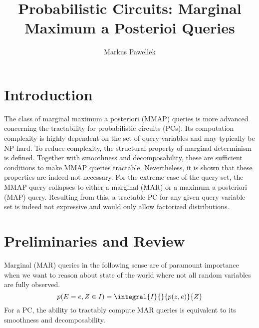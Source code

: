 \documentclass[9pt,fleqn,twoside,twocolumn]{stdglobal}
\title{%
  Probabilistic Circuits: Marginal Maximum a Posterioi Queries
}
\author{Markus Pawellek}
\begin{document}
\thispagestyle{sectionstyle}



\section{Introduction}
  The class of marginal maximum a posteriori (MMAP) queries is more advanced concerning the tractability for probabilistic circuits (PCs).
  Its computation complexity is highly dependent on the set of query variables and may typically be NP-hard.
  To reduce complexity, the structural property of marginal determinism is defined.
  Together with smoothness and decomposability, these are sufficient conditions to make MMAP queries tractable.
  Nevertheless, it is shown that these properties are indeed not necessary.
  For the extreme case of the query set, the MMAP query collapses to either a marginal (MAR) or a maximum a posteriori (MAP) query.
  Resulting from this, a tractable PC for any given query variable set is indeed not expressive and would only allow factorized distributions.

\section{Preliminaries and Review}
  Marginal (MAR) queries in the following sense are of paramount importance when we want to reason about state of the world where not all random variables are fully observed.
  \[
    p(E=e, Z\in I) = \integral{I}{}{p(z,e)}{Z}
  \]
  For a PC, the ability to tractably compute MAR queries is equivalent to its smoothness and decomposability.
\end{document}
